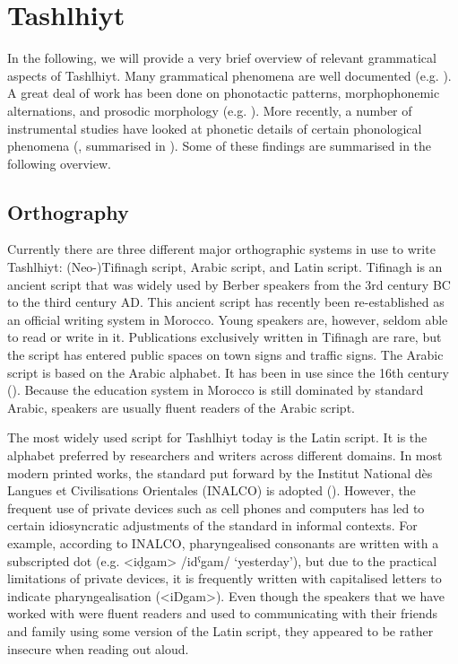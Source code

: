 \section{Tashlhiyt}\label{sec:3.4}
In the following, we will provide a very brief overview of relevant grammatical aspects of Tashlhiyt. Many grammatical phenomena are well documented (e.g. \citealt{Stumme1899,Aspinion1953,Applegate1958,Galand1988,DE1988,DE2002}). A great deal of work has been done on phonotactic patterns, morphophonemic alternations, and prosodic morphology (e.g. \citealt{Jebbour1996,Boukous1987,Lasri1991,Bensoukas2001,Lahrouchi2001,Ridouane2003}). More recently, a number of instrumental studies have looked at phonetic details of certain phonological phenomena (\citealt{Ouakrim1994,Ouakrim1995,Ridouane2003,Ridouane2007gem,Ridouane2008,RidouaneFougeron2011,GordonNafi2012,Hermes.etal2011}, summarised in \citealt{Ridouane2014}). Some of these findings are summarised in the following overview.

\subsection{Orthography}\label{sec:3.4.1}
Currently there are three different major orthographic systems in use to write Tashlhiyt: (Neo-)Tifinagh script, Arabic script, and Latin script. Tifinagh is an ancient script that was widely used by Berber speakers from the 3rd century BC to the third century AD. This ancient script has recently been re-established as an official writing system in Morocco. Young speakers are, however, seldom able to read or write in it. Publications exclusively written in Tifinagh are rare, but the script has entered public spaces on town signs and traffic signs. The Arabic script is based on the Arabic alphabet. It has been in use since the 16th century (\citealt{Boogert1997}). Because the education system in Morocco is still dominated by standard Arabic, speakers are usually fluent readers of the Arabic script.

The most widely used script for Tashlhiyt today is the Latin script. It is the alphabet preferred by researchers and writers across different domains. In most modern printed works, the standard put forward by the Institut National dès Langues et Civilisations Orientales (INALCO) is adopted (\citealt{Chaker1996}). However, the frequent use of private devices such as cell phones and computers has led to certain idiosyncratic adjustments of the standard in informal contexts. For example, according to INALCO, pharyngealised consonants are written with a subscripted dot (e.g. <iḍgam> /idˁgam/ ‘yesterday’), but due to the practical limitations of private devices, it is frequently written with capitalised letters to indicate pharyngealisation (<iDgam>). Even though the speakers that we have worked with were fluent readers and used to communicating with their friends and family using some version of the Latin script, they appeared to be rather insecure when reading out aloud. 

